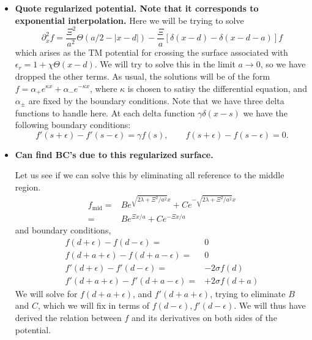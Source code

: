 \begin{itemize}
\item \textbf{Quote regularized potential.  Note that it corresponds to exponential interpolation.}
Here we will be trying to solve
\begin{equation}
\partial_x^2f =\frac{\Xi^2}{a^2}\Theta(a/2-|x-d|) - \frac{\Xi}{a}[\delta(x-d)-\delta(x-d-a)]f
\end{equation}
which arises as the TM potential for crossing the surface associated with $\epsilon_r = 1+\chi\Theta(x-d)$.  We will try to solve this in the limit $a\rightarrow 0$, so we have dropped the other terms.  
As usual, the solutions will be of the form $f = \alpha_+ e^{\kappa x}+\alpha_- e^{-\kappa x}$, where $\kappa$ is chosen to satisy the differential equation, and $\alpha_\pm$ are fixed by the boundary conditions.  Note that we have three delta functions to handle here.  At each delta function $\gamma \delta(x-s)$ we have the following boundary conditions:
\begin{equation}
f'(s+\epsilon)-f'(s-\epsilon) = \gamma f(s),\qquad f(s+\epsilon)-f(s-\epsilon) = 0.
\end{equation}

\item \textbf{Can find BC's due to this regularized surface.}

Let us see if we can solve this by eliminating all reference to the middle region.  
\begin{align}
f_{\text{mid}} =& Be^{\sqrt{2\lambda + \Xi^2/a^2}x} + C e^{-\sqrt{2\lambda + \Xi^2/a^2}x}\\
=& Be^{\Xi x/a} + C e^{-\Xi x/a}
\end{align}
and boundary conditions, 
\begin{subequations}
\begin{align}
f(d + \epsilon)-f(d -\epsilon) =& 0\\
f(d+a+\epsilon)- f(d+a-\epsilon)=& 0\\
f'(d + \epsilon) -f'(d -\epsilon)=& -2\sigma f(d)\\
f'(d+a+\epsilon) -f'(d+a-\epsilon)=& +2\sigma f(d+a)
\end{align}
\end{subequations}
We will solve for $f(d+a+\epsilon)$, and $f'(d+a+\epsilon)$, trying to eliminate $B$ and $C$, which we will fix in terms of $f(d-\epsilon),f'(d-\epsilon)$.  We will thus have derived the relation between $f$ and its derivatives on both sides of the potential.      


\end{itemize}
